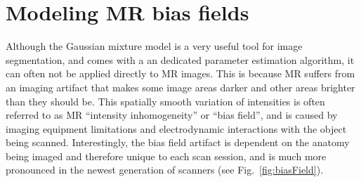 \documentclass[10pt,twoside]{book}
\begin{document}
\section{Modeling MR bias fields}
\label{sec:biasField}

Although the Gaussian mixture model is a very useful tool for image segmentation, and comes with a an dedicated parameter estimation algorithm, 
it can often not be applied directly to MR images. This is because MR suffers from an imaging artifact that makes some image areas darker and other
areas brighter than they should be. This spatially smooth variation of intensities is often referred to
as MR ``intensity inhomogeneity'' or ``bias field'', and is caused by imaging equipment limitations and electrodynamic interactions with the object
being scanned. Interestingly, the bias field artifact is dependent on the anatomy being imaged and therefore unique to each scan session, and is
much more pronounced in the newest generation of scanners (see Fig.~\ref{fig:biasField}).
\end{document}
